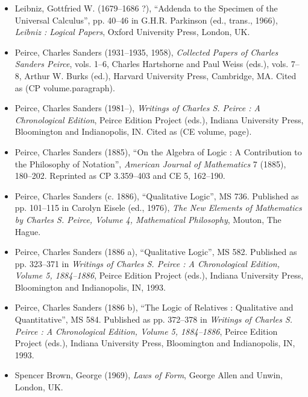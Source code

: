 \documentclass[12pt]{article}
\begin{document}
\begin{itemize}
\item
Leibniz, Gottfried W. (1679--1686 ?), ``Addenda to the Specimen of the Universal Calculus'', pp. 40--46 in G.H.R. Parkinson (ed., trans., 1966), \textit{Leibniz : Logical Papers}, Oxford University Press, London, UK.
\item
Peirce, Charles Sanders (1931--1935, 1958), \textit{Collected Papers of Charles Sanders Peirce}, vols. 1--6, Charles Hartshorne and Paul Weiss (eds.), vols. 7--8, Arthur W. Burks (ed.), Harvard University Press, Cambridge, MA.  Cited as (CP volume.paragraph).
\item
Peirce, Charles Sanders (1981--), \textit{Writings of Charles S. Peirce : A Chronological Edition}, Peirce Edition Project (eds.), Indiana University Press, Bloomington and Indianopolis, IN.  Cited as (CE volume, page).
\item
Peirce, Charles Sanders (1885), ``On the Algebra of Logic : A Contribution to the Philosophy of Notation'', \textit{American Journal of Mathematics} 7 (1885), 180--202.  Reprinted as CP 3.359--403 and CE 5, 162--190.
\item
Peirce, Charles Sanders (c. 1886), ``Qualitative Logic'', MS 736.  Published as pp. 101--115 in Carolyn Eisele (ed., 1976), \textit{The New Elements of Mathematics by Charles S. Peirce, Volume 4, Mathematical Philosophy}, Mouton, The Hague.
\item
Peirce, Charles Sanders (1886 a), ``Qualitative Logic'', MS 582.  Published as pp. 323--371 in \textit{Writings of Charles S. Peirce : A Chronological Edition, Volume 5, 1884--1886}, Peirce Edition Project (eds.), Indiana University Press, Bloomington and Indianopolis, IN, 1993.
\item
Peirce, Charles Sanders (1886 b), ``The Logic of Relatives : Qualitative and Quantitative'', MS 584.  Published as pp. 372--378 in \textit{Writings of Charles S. Peirce : A Chronological Edition, Volume 5, 1884--1886}, Peirce Edition Project (eds.), Indiana University Press, Bloomington and Indianopolis, IN, 1993.
\item
Spencer Brown, George (1969), \textit{Laws of Form}, George Allen and Unwin, London, UK.
\end{itemize}

\end{document}
